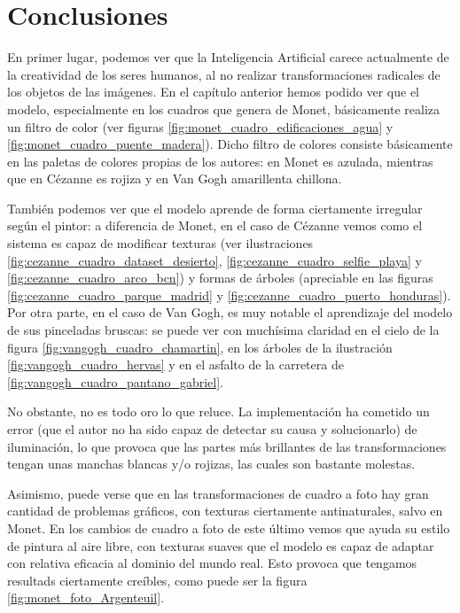\documentclass[../main.tex]{subfiles}
\begin{document}
\section{Conclusiones}

En primer lugar, podemos ver que la Inteligencia Artificial carece actualmente de la creatividad de los seres humanos, al no realizar transformaciones radicales de los objetos de las imágenes. En el capítulo anterior hemos podido ver que el modelo, especialmente en los cuadros que genera de Monet, básicamente realiza un filtro de color (ver figuras \ref{fig:monet_cuadro_edificaciones_agua} y \ref{fig:monet_cuadro_puente_madera}). Dicho filtro de colores consiste básicamente en las paletas de colores propias de los autores: en Monet es azulada, mientras que en Cézanne es rojiza y en Van Gogh amarillenta chillona. \newline

También podemos ver que el modelo aprende de forma ciertamente irregular según el pintor: a diferencia de Monet, en el caso de Cézanne vemos como el sistema es capaz de modificar texturas (ver ilustraciones \ref{fig:cezanne_cuadro_dataset_desierto}, \ref{fig:cezanne_cuadro_selfie_playa} y \ref{fig:cezanne_cuadro_arco_bcn}) y formas de árboles (apreciable en las figuras \ref{fig:cezanne_cuadro_parque_madrid} y \ref{fig:cezanne_cuadro_puerto_honduras}). Por otra parte, en el caso de Van Gogh, es muy notable el aprendizaje del modelo de sus pinceladas bruscas: se puede ver con muchísima claridad en el cielo de la figura \ref{fig:vangogh_cuadro_chamartin}, en los árboles de la ilustración \ref{fig:vangogh_cuadro_hervas} y en el asfalto de la carretera de \ref{fig:vangogh_cuadro_pantano_gabriel}. \newline

No obstante, no es todo oro lo que reluce. La implementación ha cometido un error (que el autor no ha sido capaz de detectar su causa y solucionarlo) de iluminación, lo que provoca que las partes más brillantes de las transformaciones tengan unas manchas blancas y/o rojizas, las cuales son bastante molestas. \newline

Asimismo, puede verse que en las transformaciones de cuadro a foto hay gran cantidad de problemas gráficos, con texturas ciertamente antinaturales, salvo en Monet. En los cambios de cuadro a foto de este último vemos que ayuda su estilo de pintura al aire libre, con texturas suaves que el modelo es capaz de adaptar con relativa eficacia al dominio del mundo real. Esto provoca que tengamos resultads ciertamente creíbles, como puede ser la figura \ref{fig:monet_foto_Argenteuil}. \newline
\end{document}
